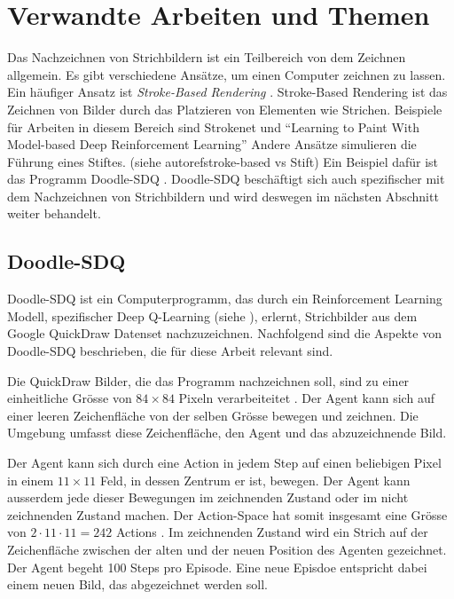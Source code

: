 \section{Verwandte Arbeiten und Themen}\label{chap:t_ver} Das Nachzeichnen von
Strichbildern ist ein Teilbereich von dem Zeichnen allgemein. Es gibt
verschiedene Ansätze, um einen Computer zeichnen zu lassen. Ein häufiger Ansatz
ist \emph{Stroke-Based Rendering} \cite{hertzmann_stroke_2002}. Stroke-Based %
Rendering ist das Zeichnen von Bilder durch das Platzieren von Elementen wie
Strichen. Beispiele für Arbeiten in diesem Bereich sind Strokenet
\cite{zheng2018strokenet} und ``Learning to Paint With Model-based Deep
Reinforcement Learning'' \cite{huang_learning_2019} Andere Ansätze simulieren
die Führung eines Stiftes. (siehe autoref{stroke-based vs Stift}) Ein Beispiel
dafür ist das Programm Doodle-SDQ \cite{zhou_learning_2018}. Doodle-SDQ
beschäftigt sich auch spezifischer mit dem Nachzeichnen von Strichbildern und
wird deswegen im nächsten Abschnitt weiter behandelt.


\subsection{Doodle-SDQ}\label{sub:t_ver_dood} Doodle-SDQ ist ein
Computerprogramm, das durch ein Reinforcement Learning Modell, spezifischer Deep
Q-Learning (siehe ), erlernt, Strichbilder aus dem Google
QuickDraw Datenset \cite{noauthor_quick_2022} %
nachzuzeichnen. Nachfolgend sind die Aspekte von Doodle-SDQ beschrieben, die für
diese Arbeit relevant sind.

Die QuickDraw Bilder, die das Programm nachzeichnen soll, sind zu einer
einheitliche Grösse von $84\times84$ Pixeln verarbeiteitet \cite[S.
7]{zhou_learning_2018}. Der Agent kann sich auf einer leeren Zeichenfläche von
der selben Grösse bewegen und zeichnen. Die Umgebung umfasst diese
Zeichenfläche, den Agent und das abzuzeichnende Bild.

Der Agent kann sich durch eine Action in jedem Step auf einen beliebigen Pixel
in einem $11\times11$ Feld, in dessen Zentrum er ist, bewegen. Der Agent kann
ausserdem jede dieser Bewegungen im zeichnenden Zustand oder im nicht
zeichnenden Zustand machen. Der Action-Space hat somit insgesamt eine Grösse von
$2\cdot11\cdot11 = 242$ Actions \cite[S. 5]{zhou_learning_2018}. Im zeichnenden
Zustand wird ein Strich auf der Zeichenfläche zwischen der alten und der neuen
Position des Agenten gezeichnet. Der Agent begeht 100 Steps pro Episode. Eine
neue Episdoe entspricht dabei einem neuen Bild, das abgezeichnet werden soll.

